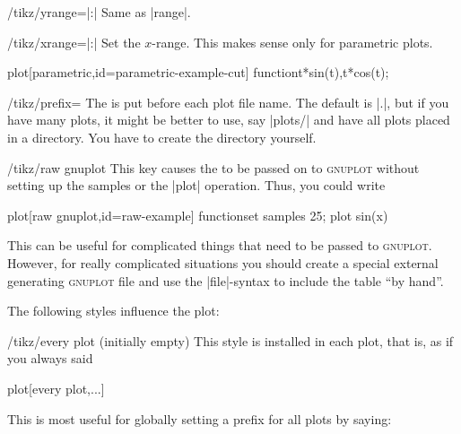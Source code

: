 \begin{key}{/tikz/yrange=|:|}
    Same as |range|.
\end{key}

\begin{key}{/tikz/xrange=|:|}
    Set the $x$-range. This makes sense only for parametric plots.
\begin{codeexample}[]
\tikz \draw[scale=0.5,domain=-3.141:3.141,smooth,xrange=0:1]
  plot[parametric,id=parametric-example-cut] function{t*sin(t),t*cos(t)};
\end{codeexample}
\end{key}


\begin{key}{/tikz/prefix=}
    The  is put before each plot file name. The default is
    |\jobname.|, but if you have many plots, it might be better to use, say
    |plots/| and have all plots placed in a directory. You have to create the
    directory yourself.
\end{key}

\begin{key}{/tikz/raw gnuplot}
    This key causes the  to be passed on to
    \textsc{gnuplot} without setting up the samples or the |plot| operation.
    Thus, you could write
\begin{codeexample}
plot[raw gnuplot,id=raw-example] function{set samples 25; plot sin(x)}
\end{codeexample}
    This can be useful for complicated things that need to be passed to
    \textsc{gnuplot}. However, for really complicated situations you should
    create a special external generating \textsc{gnuplot} file and use the
    |file|-syntax to include the table ``by hand''.
\end{key}

The following styles influence the plot:
%
\begin{stylekey}{/tikz/every plot (initially \normalfont empty)}
    This style is installed in each plot, that is, as if you always said
\begin{codeexample}
  plot[every plot,...]
\end{codeexample}
    This is most useful for globally setting a prefix for all plots by saying:
\begin{codeexample}
\end{codeexample}
\end{stylekey}


